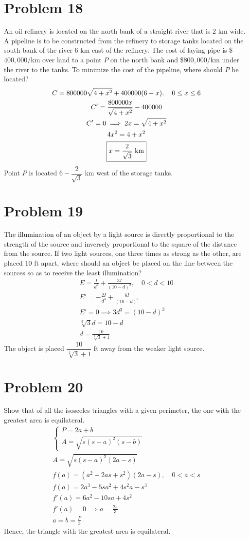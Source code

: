 \documentclass[12pt]{article}
\newcommand*{\cbrt}[1]{\ensuremath{\sqrt[3]{#1}}}
\newcommand{\problem}[1]{\section{Problem #1}}
\begin{document}
\problem{18}
An oil refinery is located on the north bank of a straight river that is 2 km wide. A pipeline is to
be constructed from the refinery to storage tanks located on the south bank of the river 6 km east of
the refinery. The cost of laying pipe is \$$400, 000$/km over land to a point $P$ on the north bank and
\$$800, 000$/km under the river to the tanks. To minimize the cost of the pipeline, where should $P$ be
located?
\begin{gather*}
    C=800000\sqrt{4+x^2}+400000(6-x), \quad 0\le x\le 6\\
    C'=\frac{800000x}{\sqrt{4+x^2}}-400000\\
    C'=0 \implies 2x=\sqrt{4+x^2}\\
    4x^2=4+x^2\\
    \boxed{x=\frac{2}{\sqrt{3}} $ km$}
\end{gather*}
Point $P$ is located $6-\dfrac{2}{\sqrt{3}}$ km west of the storage tanks. 

\problem{19}
The illumination of an object by a light source is directly proportional to the strength of the source and
inversely proportional to the square of the distance from the source. If two light sources, one three times
as strong as the other, are placed 10 ft apart, where should an object be placed on the line between the
sources so as to receive the least illumination?
\begin{gather*}
    E = \frac{I}{d^2}+\frac{3I}{(10-d)^2},\quad 0<d<10\\
    E'=-\frac{2I}{d^3}+\frac{6I}{(10-d)^3}\\
    E'=0 \implies 3d^3=(10-d)^3\\
    \cbrt{3}d=10-d\\
    \boxed{d=\frac{10}{\cbrt{3}+1}}
\end{gather*}
The object is placed $\dfrac{10}{\cbrt{3}+1}$ ft away from the weaker light source. 

\problem{20}
Show that of all the isosceles triangles with a given perimeter, the one with the greatest area is equilateral.
\begin{gather*}
    \begin{cases}
        P=2a+b\\
        A=\sqrt{s(s-a)^2(s-b)}
    \end{cases}\\
    A=\sqrt{s(s-a)^2(2a-s)}\\
    f(a)=(a^2-2as+s^2)(2a-s), \quad 0<a<s\\
    f(a)=2a^3-5sa^2+4s^2a-s^3\\
    f'(a)=6a^2-10sa+4s^2\\
    f'(a)=0 \implies a=\frac{2s}{3}\\
    \boxed{a=b=\frac{P}{3}}
\end{gather*}
Hence, the triangle with the greatest area is equilateral.
\end{document}
